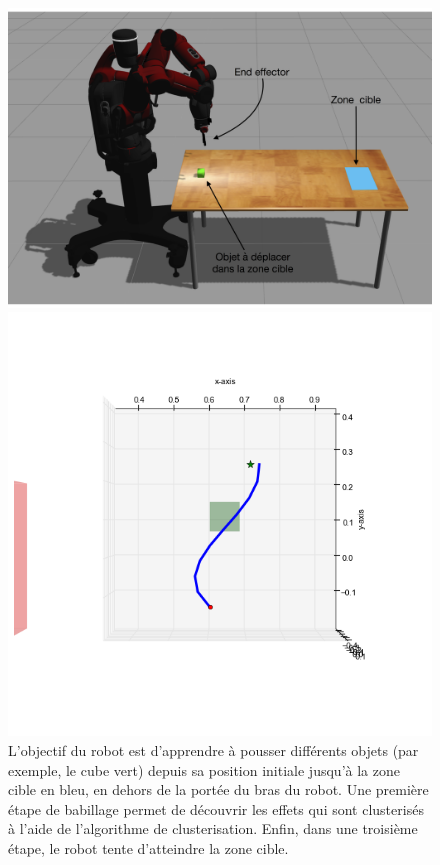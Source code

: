 \documentclass{llncs}
\begin{document}
\begin{figure}[!tbp]
  \centering
  \begin{minipage}[b]{0.45\textwidth}
    \includegraphics[width=\textwidth]{figures/Experiment_setup_annoted_FR.png}
    \caption{L'objectif du robot est d'apprendre à pousser différents objets (par exemple, le cube vert) depuis sa position initiale jusqu'à la zone cible en bleu, en dehors de la portée du bras du robot. Une première étape de babillage permet de découvrir les effets qui sont clusterisés à l'aide de l'algorithme de clusterisation. Enfin, dans une troisième étape, le robot tente d'atteindre la zone cible.}
    \label{fig:setup}
  \end{minipage}
  \hfill
  \begin{minipage}[b]{0.45\textwidth}
    \includegraphics[width=\textwidth]{figures/ns_trajectory.png}

\end{minipage}
\end{figure}
\end{document}
